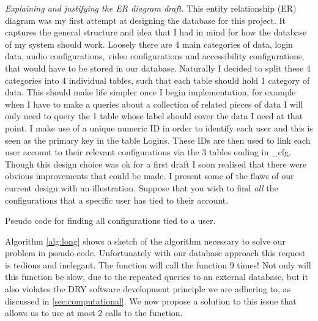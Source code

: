 \textit{Explaining and justifying the ER diagram draft.}
This entity relationship (ER) diagram was my first attempt at
designing the database for this project. It captures the 
general structure and idea that I had in mind for how the
database of my system should work. Loosely there are 4 main 
categories of data, login data, audio configurations,
video configurations and accessibility configurations, that
would have to be stored in our database. Naturally I decided 
to split these 4 categories into 4 individual tables, such 
that each table should hold 1 category of data. This should 
make life simpler once I begin implementation, for example 
when I have to make a queries about a collection of related
pieces of data I will only need to query the 1 table whose 
label should cover the data I need at that point. I make use 
of a unique numeric ID in order to identify each user and this
is seen as the primary key in the table {\sffamily Logins}.
These IDs are then used to link each user account to their 
relevant configurations via the 3 tables ending in 
{\sffamily \_cfg}. Though this design choice was ok for a 
first draft I soon realised that there were obvious
improvements that could be made. I present some of the flaws
of our current design with an illustration. Suppose that you 
wish to find \emph{all} the configurations that a specific 
user has tied to their account.

\begin{algorithm}
\caption{Pseudo code for finding all configurations tied to a
user.}
\label{alg:long}
\sffamily

\begin{algorithmic}[1]
     
    \State{}
    
    \State{\ldots}
    \State{}

  \EndFunction
\end{algorithmic}

\end{algorithm}

\mdseries

Algorithm \ref{alg:long} shows a sketch of the algorithm
necessary to solve our problem in pseudo-code. Unfortunately
with our database approach this request is tedious and
inelegant. The function will call the 
function 9 times! Not only will this function be slow, due to
the repeated queries to an external database, but it
also violates the DRY software development principle we are
adhering to, as discussed in \ref{sec:computational}. We now 
propose a solution to this issue that allows us to use at most
2 calls to the  function.

